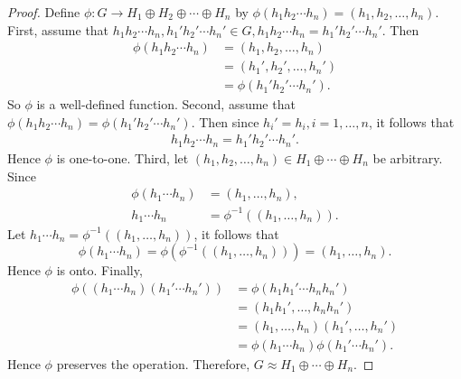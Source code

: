 \documentclass{article}
\newtheorem{theorem}{Theorem}[section]
\theoremstyle{definition}
\begin{document}
\begin{proof}
           Define $\phi: G \to H_1 \oplus H_2 \oplus \cdots \oplus H_n$ by $\phi(h_1h_2 \cdots h_n) = (h_1,h_2,\dots,h_n)$. First, assume that $h_1h_2 \cdots h_n, h_1'h_2' \cdots h_n' \in G, h_1h_2 \cdots h_n = h_1'h_2' \cdots h_n'$. Then
           \begin{align*}
               \phi(h_1h_2 \cdots h_n) &= (h_1,h_2,\dots,h_n) \\
               &= (h_1',h_2',\dots,h_n') \\
               &= \phi(h_1'h_2' \cdots h_n').
           \end{align*}
           So $\phi$ is a well-defined function. Second, assume that $\phi(h_1h_2 \cdots h_n) = \phi(h_1'h_2' \cdots h_n')$. Then since $h_i' = h_i, i = 1,\dots,n$, it follows that
           \begin{align*}
               h_1h_2 \cdots h_n = h_1'h_2' \cdots h_n'.
           \end{align*}
           Hence $\phi$ is one-to-one. Third, let $(h_1,h_2,\dots,h_n) \in H_1 \oplus \cdots \oplus H_n$ be arbitrary. Since
           \begin{align*}
               \phi(h_1 \cdots h_n) &= (h_1,\dots,h_n), \\
               h_1 \cdots h_n &= \phi^{-1}((h_1, \dots, h_n)).
           \end{align*}
           Let $h_1 \cdots h_n = \phi^{-1}((h_1, \dots, h_n))$, it follows that
           \begin{equation*}
               \phi(h_1 \cdots h_n) = \phi(\phi^{-1}((h_1, \dots, h_n))) = (h_1, \dots, h_n).
           \end{equation*}
           Hence $\phi$ is onto. Finally,
           \begin{align*}
               \phi((h_1 \cdots h_n)(h_1' \cdots h_n')) &= \phi(h_1h_1' \cdots h_nh_n') \\
               &= (h_1h_1',\dots,h_nh_n') \\
               &= (h_1,\dots,h_n)(h_1',\dots,h_n') \\
               &= \phi(h_1 \cdots h_n)\phi(h_1' \cdots h_n').
           \end{align*}
           Hence $\phi$ preserves the operation. Therefore, $G \approx H_1 \oplus \cdots \oplus H_n$.
        \end{proof}
        
        \noindent{}
        
\end{document}
